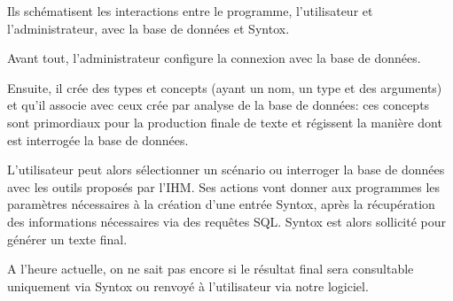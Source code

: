 \documentclass[12pt]{report}
\begin{document}
Ils schématisent les interactions entre le programme, l'utilisateur et l'administrateur, avec la base de données et Syntox.


Avant tout, l'administrateur configure la connexion avec la base de données.

Ensuite, il crée des types et concepts (ayant un nom, un type et des arguments) et qu'il associe avec ceux crée par analyse de la base de données: ces concepts sont primordiaux pour la production finale de texte et régissent la manière dont est interrogée la base de données.



L'utilisateur peut alors sélectionner un scénario ou interroger la base de données avec les outils proposés par l'IHM. Ses actions vont donner aux programmes les paramètres nécessaires à la création d'une entrée Syntox, après la récupération des informations nécessaires via des requêtes SQL. Syntox est alors sollicité pour générer un texte final.

A l'heure actuelle, on ne sait pas encore si le résultat final sera consultable uniquement via Syntox ou renvoyé à l'utilisateur via notre logiciel.
\end{document}
